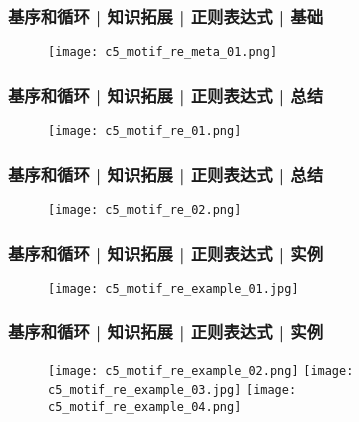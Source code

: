 \begin{frame}
  \frametitle{基序和循环 | 知识拓展 | 正则表达式 | \alert{基础}}
  \begin{figure}
    \centering
    \texttt{[image: c5\_motif\_re\_meta\_01.png]}
  \end{figure}
\end{frame}

\begin{frame}
  \frametitle{基序和循环 | 知识拓展 | 正则表达式 | 总结}
  \begin{figure}
    \centering
    \texttt{[image: c5\_motif\_re\_01.png]}
  \end{figure}
\end{frame}

\begin{frame}
  \frametitle{基序和循环 | 知识拓展 | 正则表达式 | 总结}
  \begin{figure}
    \centering
    \texttt{[image: c5\_motif\_re\_02.png]}
  \end{figure}
\end{frame}

\begin{frame}
  \frametitle{基序和循环 | 知识拓展 | 正则表达式 | 实例}
  \begin{figure}
    \centering
    \texttt{[image: c5\_motif\_re\_example\_01.jpg]}
  \end{figure}
\end{frame}

\begin{frame}
  \frametitle{基序和循环 | 知识拓展 | 正则表达式 | 实例}
  \begin{figure}
    \centering
    \texttt{[image: c5\_motif\_re\_example\_02.png]}
    \texttt{[image: c5\_motif\_re\_example\_03.jpg]}
    \vspace{0.51em}
    \texttt{[image: c5\_motif\_re\_example\_04.png]}
  \end{figure}
\end{frame}

